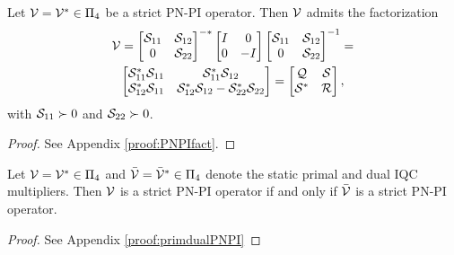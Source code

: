 \begin{lemma}\label{lem:PNPIfact}
	Let $\mathcal{V}=\mathcal{V}^*\in\Pi_4$ be a strict PN-PI operator. Then $\mathcal{V}$ admits the factorization
	\begin{gather*}
		\mathcal{V}=\begin{bmatrix}\mathcal{S}_{11} & \mathcal{S}_{12} \\ 0 & \mathcal{S}_{22}\end{bmatrix}^{-*}\begin{bmatrix}I & 0 \\ 0 & -I\end{bmatrix}\begin{bmatrix}\mathcal{S}_{11} & \mathcal{S}_{12} \\ 0 & \mathcal{S}_{22}\end{bmatrix}^{-1}=\\\begin{bmatrix}\mathcal{S}_{11}^*\mathcal{S}_{11} & \mathcal{S}_{11}^*\mathcal{S}_{12} \\ \mathcal{S}_{12}^*\mathcal{S}_{11} & \mathcal{S}_{12}^*\mathcal{S}_{12}-\mathcal{S}_{22}^*\mathcal{S}_{22}\end{bmatrix}=\begin{bmatrix}\mathcal{Q} & \mathcal{S} \\ \mathcal{S}^* & \mathcal{R}\end{bmatrix},
	\end{gather*}
	with $\mathcal{S}_{11}\succ0$ and $\mathcal{S}_{22}\succ0$.
\end{lemma}
\begin{proof}
	See Appendix \ref{proof:PNPIfact}.
\end{proof}

\begin{lemma}\label{lem:primdualPNPI}
	Let $\mathcal{V}=\mathcal{V}^*\in\Pi_4$ and $\bar{\mathcal{V}}=\bar{\mathcal{V}}^*\in\Pi_4$ denote the static primal and dual IQC multipliers. Then $\mathcal{V}$ is a strict PN-PI operator if and only if $\bar{\mathcal{V}}$ is a strict PN-PI operator.
\end{lemma}
\begin{proof}
	See Appendix \ref{proof:primdualPNPI}
\end{proof}
